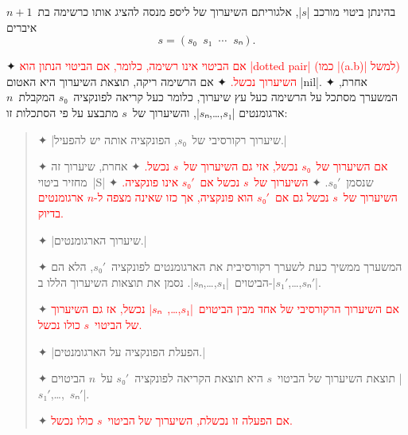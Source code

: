 \begin{minipage}{0.9\textwidth}
  \centering
\newcommand\exception[1]{{\textcolor{red}{#1}}}
\begin{mdframed}[backgroundcolor=Lavender!20]
  \footnotesize
  בהינתן ביטוי מורכב \E|$s$|, אלגוריתם השיערוך של ליספ מנסה
  להציג אותו כרשימה בת~$n+1$ איברים \[
    s=(s₀\;\;s₁\;\;⋯\;\;sₙ).
\] \begin{enumerate}
    ✦ \exception{
      אם הביטוי אינו רשימה, כלומר, אם הביטוי הנתון הוא \E|dotted pair| (כמו
      \E|(a.b)| למשל) השיערוך נכשל.}
    ✦ אם הרשימה ריקה, תוצאת השיערוך היא האטום \T|nil|.
    ✦ אחרת, המשערך מסתכל על הרשימה כעל עץ שיערוך, כלומר כעל קריאה
    לפונקציה~$s₀$ המקבלת~$n$ ארגומנטים \E|$s₁$,…,$sₙ$|, והשיערוך של~$s$ מתבצע
    על פי הסתכלות זו:
    \begin{quote}
      \begin{enumerate}
        ✦ \ע|שיערוך רקורסיבי של~$s₀$, הפונקציה אותה יש להפעיל.|
        \begin{itemize}
          ✦ \exception{אם השיערוך של~$s₀$ נכשל, אזי גם השיערוך של~$s$ נכשל.}
          ✦ אחרת, שיערוך זה מחזיר ביטוי~\E|S| שנסמן~$s₀'$.
          ✦ \exception{השיערוך של~$s$ נכשל אם~$s₀'$ אינו פונקציה.}
          ✦ \exception{השיערוך של~$s$ נכשל גם אם~$s₀'$ הוא פונקציה, אך כזו
            שאינה מצפה ל-$n$ ארגומנטים בדיוק.}
        \end{itemize}
        ✦ \ע|שיערוך הארגומנטים.|
        \begin{itemize}
          ✦ המשערך ממשיך כעת לשערך רקורסיבית את הארגומנטים לפונקציה~$s₀'$,
          הלא הם הביטוים~\E|$s₁$,…,$sₙ$|. נסמן את תוצאות השיערוך הללו
          ב-\E|$s₁'$,…,$sₙ'$|.

          ✦ \exception{אם השיערוך הרקורסיבי של אחד מבין
            הביטוים~\E|$s₁$,…,~$sₙ$| נכשל, אז גם השיערוך של הביטוי~$s$ כולו
            נכשל.}
        \end{itemize}

        ✦ \ע|הפעלת הפונקציה על הארגומנטים.|

        \begin{itemize}
          ✦ תוצאת השיערוך של הביטוי~$s$ היא תוצאת הקריאה לפונקציה~$s₀'$
          על~$n$ הביטוים \E|$s₁'$,…,~$sₙ'$|.

          ✦ \exception{אם הפעלה זו נכשלת, השיערוך של הביטוי~$s$ כולו נכשל.}
        \end{itemize}
      \end{enumerate}
    \end{quote}
  \end{enumerate}
\end{mdframed}
\end{minipage}

